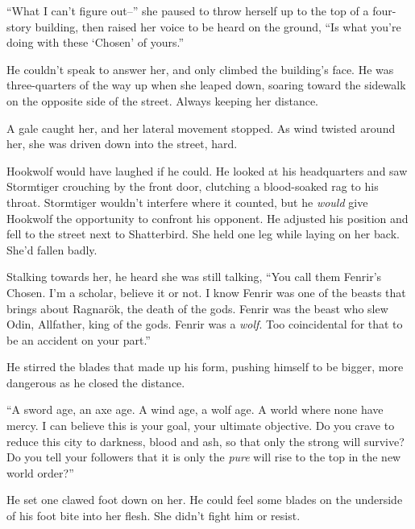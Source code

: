 ``What I can't figure out--'' she paused to throw herself up to the top of a four-story building, then raised her voice to be heard on the ground, ``Is what you're doing with these `Chosen' of yours.''



He couldn't speak to answer her, and only climbed the building's face.  He was three-quarters of the way up when she leaped down, soaring toward the sidewalk on the opposite side of the street.  Always keeping her distance.



A gale caught her, and her lateral movement stopped.  As wind twisted around her, she was driven down into the street, hard.



Hookwolf would have laughed if he could.  He looked at his headquarters and saw Stormtiger crouching by the front door, clutching a blood-soaked rag to his throat.  Stormtiger wouldn't interfere where it counted, but he \emph{would} give Hookwolf the opportunity to confront his opponent.  He adjusted his position and fell to the street next to Shatterbird.  She held one leg while laying on her back.  She'd fallen badly.



Stalking towards her, he heard she was still talking, ``You call them Fenrir's Chosen.  I'm a scholar, believe it or not.  I know Fenrir was one of the beasts that brings about Ragnar\"{o}k, the death of the gods.  Fenrir was the beast who slew Odin, Allfather, king of the gods.  Fenrir was a \emph{wolf}.  Too coincidental for that to be an accident on your part.''



He stirred the blades that made up his form, pushing himself to be bigger, more dangerous as he closed the distance.



``A sword age, an axe age.  A wind age, a wolf age.  A world where none have mercy.  I can believe this is your goal, your ultimate objective.  Do you crave to reduce this city to darkness, blood and ash, so that only the strong will survive?  Do you tell your followers that it is only the \emph{pure} will rise to the top in the new world order?''



He set one clawed foot down on her.  He could feel some blades on the underside of his foot bite into her flesh.  She didn't fight him or resist.



